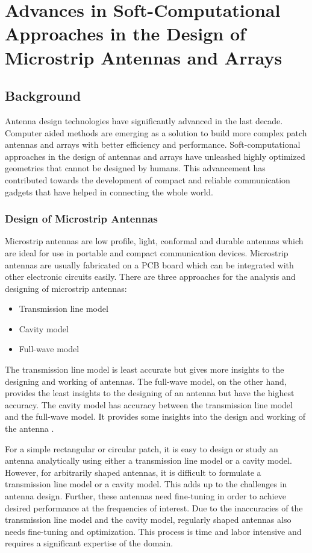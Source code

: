 \chapter{Advances in Soft-Computational Approaches in the Design of Microstrip Antennas and Arrays}
\label{chap:chap2}
\section{Background}
Antenna design technologies have significantly advanced in the last decade. Computer aided methods are emerging as a solution to build more complex patch antennas and arrays with better efficiency and performance. Soft-computational approaches in the design of antennas and arrays have unleashed highly optimized geometries that cannot be designed by humans. This advancement has contributed towards the development of compact and reliable communication gadgets that have helped in connecting the whole world.

\subsection{Design of Microstrip Antennas}
Microstrip antennas are low profile, light, conformal and durable antennas which are ideal for use in portable and compact communication devices. Microstrip antennas are usually fabricated on a PCB board which can be integrated with other electronic circuits easily. There are three approaches for the analysis and designing of microstrip antennas:
\begin{itemize}
\item Transmission line model
\item Cavity model
\item Full-wave model
\end{itemize}

The transmission line model is least accurate but gives more insights to the designing and working of antennas. The full-wave model, on the other hand, provides the least insights to the designing of an antenna but have the highest accuracy. The cavity model has accuracy between the transmission line model and the full-wave model. It provides some insights into the design and working of the antenna \cite{balanis}.

For a simple rectangular or circular patch, it is easy to design or study an antenna analytically using either a transmission line model or a cavity model. However, for arbitrarily shaped antennas, it is difficult to formulate a transmission line model or a cavity model. This adds up to the challenges in antenna design. Further, these antennas need fine-tuning in order to achieve desired performance at the frequencies of interest. Due to the inaccuracies of the transmission line model and the cavity model, regularly shaped antennas also needs fine-tuning and optimization. This process is time and labor intensive and requires a significant expertise of the domain.

